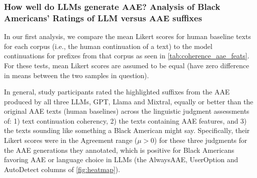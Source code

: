 

\subsubsection{How well do LLMs generate AAE? Analysis of Black Americans' Ratings of LLM versus AAE suffixes} \label{sec:llmgenaae}


In our first analysis, we compare the mean Likert scores for human baseline texts for each corpus (i.e., the human continuation of a text) to the model continuations for prefixes from that corpus as seen in \autoref{tab:coherence_aae_feats}. For these tests, mean Likert scores are assumed to be equal (have zero difference in means between the two samples in question). %

In general, study participants rated the highlighted suffixes from the AAE produced by all three LLMs, GPT, Llama and Mixtral, equally or better than the original AAE texts (human baselines) across the linguistic judgment assessments of: 1) text continuation coherency, 2) the texts containing AAE features, and 3) the texts sounding like something a Black American might say. Specifically, their Likert scores were in the Agreement range ($\mu> 0$) for these three judgments for the AAE generations they annotated, which is positive for Black Americans favoring AAE or language choice in LLMs (the AlwaysAAE, UserOption and AutoDetect columns of \autoref{fig:heatmap}). 

